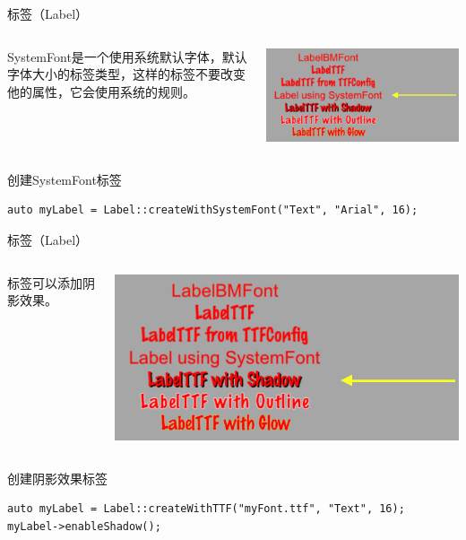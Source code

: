\documentclass{beamer}
\begin{document}

\begin{frame}[fragile]{标签（Label）}
\begin{columns}
\begin{column}{0.4\textwidth}
SystemFont是一个使用系统默认字体，默认字体大小的标签类型，这样的标签不要改变他的属性，它会使用系统的规则。
\end{column}
\begin{column}{0.6\textwidth}
\includegraphics[width=\textwidth]
{figures/label_3}
\end{column}
\end{columns}
\begin{block}{创建SystemFont标签}
\begin{verbatim}
auto myLabel = Label::createWithSystemFont("Text", "Arial", 16);
\end{verbatim}
\end{block}
\end{frame}


\begin{frame}[fragile]{标签（Label）}
\begin{columns}
\begin{column}{0.4\textwidth}
标签可以添加阴影效果。
\end{column}
\begin{column}{0.6\textwidth}
\includegraphics[width=\textwidth]
{figures/label_4}
\end{column}
\end{columns}
\begin{block}{创建阴影效果标签}
\begin{verbatim}
auto myLabel = Label::createWithTTF("myFont.ttf", "Text", 16);
myLabel->enableShadow();
\end{verbatim}
\end{block}
\end{frame}
\end{document}
